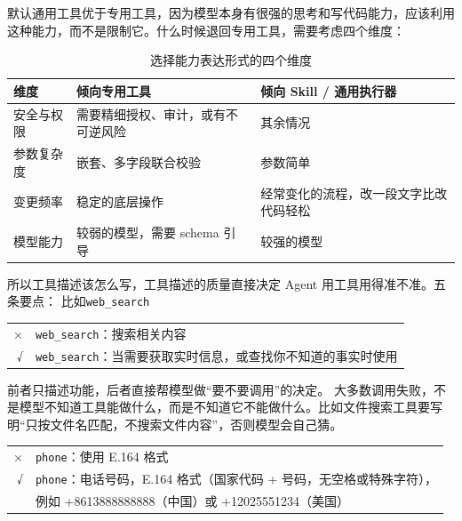 默认通用工具优于专用工具，因为模型本身有很强的思考和写代码能力，应该利用这种能力，而不是限制它。什么时候退回专用工具，需要考虑四个维度：
\begin{table}[H]
\centering
\caption{选择能力表达形式的四个维度}
\label{tab:tool-form-dimensions}
\begin{tabular}{p{2.6cm} p{5.6cm} p{6.4cm}}
  \toprule
  维度 & 倾向专用工具 & 倾向 Skill / 通用执行器 \\
  \midrule
  安全与权限 & 需要精细授权、审计，或有不可逆风险 & 其余情况 \\
  参数复杂度 & 嵌套、多字段联合校验 & 参数简单 \\
  变更频率   & 稳定的底层操作 & 经常变化的流程，改一段文字比改代码轻松 \\
  模型能力   & 较弱的模型，需要 schema 引导 & 较强的模型 \\
  \bottomrule
\end{tabular}
\end{table}
\noindent 所以工具描述该怎么写，工具描述的质量直接决定 Agent 用工具用得准不准。五条要点：
比如\texttt{web\_search}
\begin{tcolorbox}[enhanced, sharp corners, boxrule=0pt, frame hidden,
                  borderline west={3pt}{0pt}{structurecolor},
                  colback=structurecolor!5]
\begin{tabular}{@{}r@{\quad}l@{}}
  × & \texttt{web\_search}：搜索相关内容 \\
  √ & \texttt{web\_search}：当需要获取实时信息，或查找你不知道的事实时使用
\end{tabular}
\end{tcolorbox}
前者只描述功能，后者直接帮模型做“要不要调用”的决定。
大多数调用失败，不是模型不知道工具能做什么，而是不知道它不能做什么。比如文件搜索工具要写明“只按文件名匹配，不搜索文件内容”，否则模型会自己猜。
\begin{tcolorbox}[enhanced, sharp corners, boxrule=0pt, frame hidden,
                  borderline west={3pt}{0pt}{structurecolor},
                  colback=structurecolor!5]
\begin{tabular}{@{}r@{\quad}l@{}}
  × & \texttt{phone}：使用 E.164 格式 \\
  √ & \texttt{phone}：电话号码，E.164 格式（国家代码 + 号码，无空格或特殊字符），\\
  & 例如 +8613888888888（中国）或 +12025551234（美国）
\end{tabular}
\end{tcolorbox}

